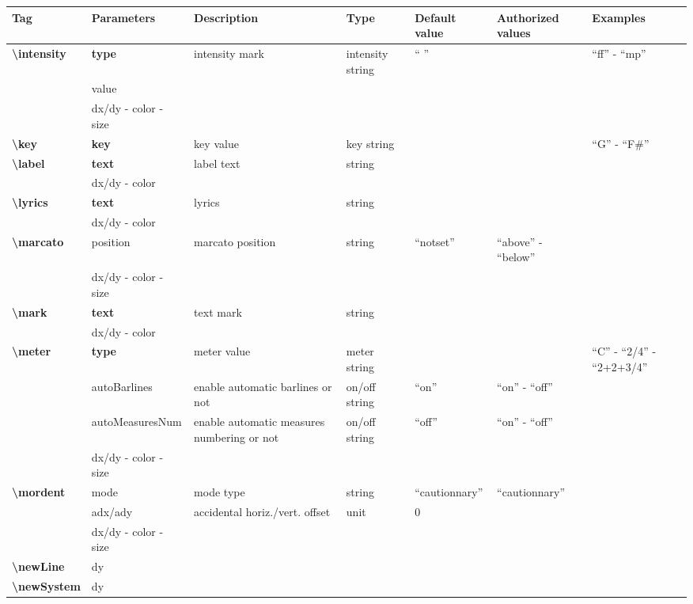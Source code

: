 \documentclass[a4paper, landscape, 10pt]{article}
\begin{document}
\begin{tabularx}{\linewidth}{p{3cm}p{3cm}p{5cm}p{3cm}p{2.5cm}p{3.5cm}p{4cm}}
    \hline
    \textbf{Tag}&\textbf{Parameters}&\textbf{Description}&\textbf{Type}&\textbf{Default value}&\textbf{Authorized values}&\textbf{Examples}\\
    \hline
    \textbf{\textbackslash{}intensity}&\textbf{type}&intensity mark&intensity string&`` ''&&``ff'' - ``mp''\\
    &value&&&&&\\ %
    &dx/dy - color - size&&&&&\\
    \hline
    \textbf{\textbackslash{}key}&\textbf{key}&key value&key string&&&``G'' - ``F\#''\\
    \hline
    \textbf{\textbackslash{}label}&\textbf{text}&label text&string&&&\\
    &dx/dy - color&&&&&\\
    \hline
    \textbf{\textbackslash{}lyrics}&\textbf{text}&lyrics&string&&&\\
    &dx/dy - color&&&&&\\
    \hline
    \textbf{\textbackslash{}marcato}&position&marcato position&string&``notset''&``above'' - ``below''&\\
    &dx/dy - color - size&&&&&\\
    \hline
    \textbf{\textbackslash{}mark}&\textbf{text}&text mark&string&&&\\
    &dx/dy - color&&&&&\\
    \hline
    \textbf{\textbackslash{}meter}&\textbf{type}&meter value&meter string&&&``C'' - ``2/4'' - ``2+2+3/4''\\
    &autoBarlines&enable automatic barlines or not&on/off string&``on''&``on'' - ``off''&\\
    &autoMeasuresNum&enable automatic measures numbering or not&on/off string&``off''&``on'' - ``off''&\\
    &dx/dy - color - size&&&&&\\
    \hline
    \textbf{\textbackslash{}mordent}&mode&mode type&string&``cautionnary''&``cautionnary''&\\
    &adx/ady&accidental horiz./vert. offset&unit&0&&\\
    &dx/dy - color - size&&&&&\\
    \hline
    \textbf{\textbackslash{}newLine}&dy&&&&&\\ %
    \hline
    \textbf{\textbackslash{}newSystem}&dy&&&&&\\ %

\end{tabularx}
\end{document}
